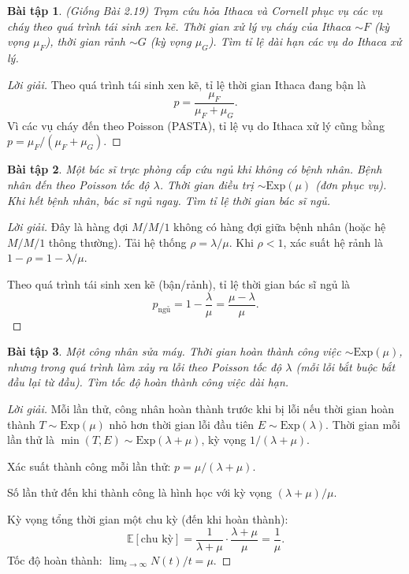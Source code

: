 \documentclass[8pt,a4paper]{article}
\newtheorem{exercise}{Bài tập}
\newenvironment{solution}{\begin{proof}[Lời giải]}{\end{proof}}
\newcommand{\E}{\mathbb{E}}
\begin{document}
\begin{exercise}
(Giống Bài 2.19) Trạm cứu hỏa Ithaca và Cornell phục vụ các vụ cháy theo quá trình tái sinh xen kẽ. Thời gian xử lý vụ cháy của Ithaca $\sim F$ (kỳ vọng $\mu_F$), thời gian rảnh $\sim G$ (kỳ vọng $\mu_G$). Tìm tỉ lệ dài hạn các vụ do Ithaca xử lý.
\end{exercise}
\begin{solution}
Theo quá trình tái sinh xen kẽ, tỉ lệ thời gian Ithaca đang bận là
\[
  p = \frac{\mu_F}{\mu_F + \mu_G}.
\]
Vì các vụ cháy đến theo Poisson (PASTA), tỉ lệ vụ do Ithaca xử lý cũng bằng $p = \mu_F/(\mu_F+\mu_G)$.
\end{solution}

\begin{exercise}
Một bác sĩ trực phòng cấp cứu ngủ khi không có bệnh nhân. Bệnh nhân đến theo Poisson tốc độ $\lambda$. Thời gian điều trị $\sim \text{Exp}(\mu)$ (đơn phục vụ). Khi hết bệnh nhân, bác sĩ ngủ ngay. Tìm tỉ lệ thời gian bác sĩ ngủ.
\end{exercise}
\begin{solution}
Đây là hàng đợi $M/M/1$ không có hàng đợi giữa bệnh nhân (hoặc hệ $M/M/1$ thông thường). Tải hệ thống $\rho = \lambda/\mu$. Khi $\rho < 1$, xác suất hệ rảnh là $1 - \rho = 1 - \lambda/\mu$.

Theo quá trình tái sinh xen kẽ (bận/rảnh), tỉ lệ thời gian bác sĩ ngủ là
\[
  p_{\text{ngủ}} = 1 - \frac{\lambda}{\mu} = \frac{\mu - \lambda}{\mu}.
\]
\end{solution}

\begin{exercise}
Một công nhân sửa máy. Thời gian hoàn thành công việc $\sim \text{Exp}(\mu)$, nhưng trong quá trình làm xảy ra lỗi theo Poisson tốc độ $\lambda$ (mỗi lỗi bắt buộc bắt đầu lại từ đầu). Tìm tốc độ hoàn thành công việc dài hạn.
\end{exercise}
\begin{solution}
Mỗi lần thử, công nhân hoàn thành trước khi bị lỗi nếu thời gian hoàn thành $T \sim \text{Exp}(\mu)$ nhỏ hơn thời gian lỗi đầu tiên $E \sim \text{Exp}(\lambda)$. Thời gian mỗi lần thử là $\min(T, E) \sim \text{Exp}(\lambda+\mu)$, kỳ vọng $1/(\lambda+\mu)$.

Xác suất thành công mỗi lần thử: $p = \mu/(\lambda+\mu)$.

Số lần thử đến khi thành công là hình học với kỳ vọng $(\lambda+\mu)/\mu$.

Kỳ vọng tổng thời gian một chu kỳ (đến khi hoàn thành):
\[
  \E[\text{chu kỳ}] = \frac{1}{\lambda+\mu} \cdot \frac{\lambda+\mu}{\mu} = \frac{1}{\mu}.
\]
Tốc độ hoàn thành: $\lim_{t\to\infty} N(t)/t = \mu$.
\end{solution}
\end{document}
